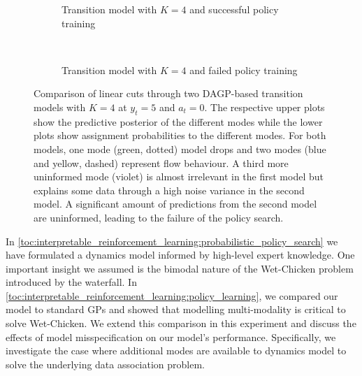\begin{figure}[tp]
    \centering
    \begin{subfigure}[t]{\linewidth}
        \centering
        
        
        \caption{
            \label{fig:interpretable_rl:wetchicken:good_cut}
            Transition model with $K=4$ and successful policy training
        }
    \end{subfigure}\\[\figureskip]
    \begin{subfigure}[t]{\linewidth}
        \centering
        
        
        \caption{
            \label{fig:interpretable_rl:wetchicken:bad_cut}
            Transition model with $K=4$ and failed policy training
        }
    \end{subfigure}
    \caption{
        \label{fig:interpretable_rl:wetchicken:cut_comparison}
        Comparison of linear cuts through two DAGP-based transition models with $K=4$ at $y_t = 5$ and $a_t=0$.
        The respective upper plots show the predictive posterior of the different modes while the lower plots show assignment probabilities to the different modes.
        For both models, one mode (green, dotted) model drops and two modes (blue and yellow, dashed) represent flow behaviour.
        A third more uninformed mode (violet) is almost irrelevant in the first model but explains some data through a high noise variance in the second model.
        A significant amount of predictions from the second model are uninformed, leading to the failure of the policy search.
    }
\end{figure}
In \cref{toc:interpretable_reinforcement_learning:probabilistic_policy_search} we have formulated a dynamics model informed by high-level expert knowledge.
One important insight we assumed is the bimodal nature of the Wet-Chicken problem introduced by the waterfall.
In \cref{toc:interpretable_reinforcement_learning:policy_learning}, we compared our model to standard GPs and showed that modelling multi-modality is critical to solve Wet-Chicken.
We extend this comparison in this experiment and discuss the effects of model misspecification on our model's performance.
Specifically, we investigate the case where additional modes are available to dynamics model to solve the underlying data association problem.

